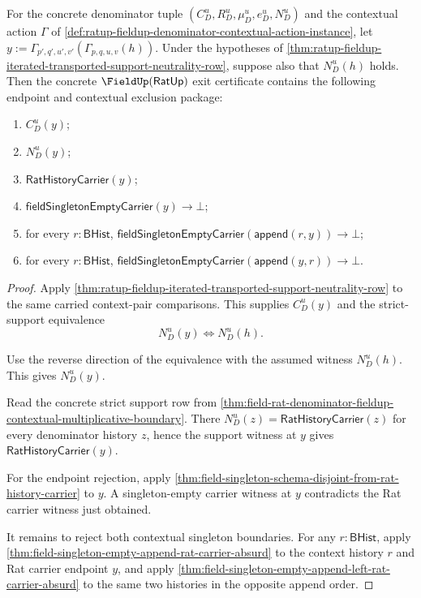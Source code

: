 \begin{theorem}
\label{thm:ratup-fieldup-iterated-transported-strict-support-contextual-singleton-exclusion}
For the concrete denominator tuple $(C_D^u,R_D^u,\mu_D^u,e_D^u,N_D^u)$ and the
contextual action $\Gamma$ of
\autoref{def:ratup-fieldup-denominator-contextual-action-instance}, let
$y:=\Gamma_{p',q',u',v'}(\Gamma_{p,q,u,v}(h))$. Under the hypotheses of
\autoref{thm:ratup-fieldup-iterated-transported-support-neutrality-row},
suppose also that $N_D^u(h)$ holds. Then the concrete
$\FieldUp(\mathsf{RatUp})$ exit certificate contains the following endpoint
and contextual exclusion package:
\begin{enumerate}
  \item $C_D^u(y)$;
  \item $N_D^u(y)$;
  \item $\mathsf{RatHistoryCarrier}(y)$;
  \item $\mathsf{fieldSingletonEmptyCarrier}(y)\to\bot$;
  \item for every $r:\mathsf{BHist}$,
  $\mathsf{fieldSingletonEmptyCarrier}(\mathsf{append}(r,y))\to\bot$;
  \item for every $r:\mathsf{BHist}$,
  $\mathsf{fieldSingletonEmptyCarrier}(\mathsf{append}(y,r))\to\bot$.
\end{enumerate}
\end{theorem}
\begin{proof}
Apply
\autoref{thm:ratup-fieldup-iterated-transported-support-neutrality-row} to the
same carried context-pair comparisons. This supplies $C_D^u(y)$ and the
strict-support equivalence
$$
N_D^u(y)\Longleftrightarrow N_D^u(h).
$$

Use the reverse direction of the equivalence with the assumed witness
$N_D^u(h)$. This gives $N_D^u(y)$.

Read the concrete strict support row from
\autoref{thm:field-rat-denominator-fieldup-contextual-multiplicative-boundary}.
There $N_D^u(z)=\mathsf{RatHistoryCarrier}(z)$ for every denominator history
$z$, hence the support witness at $y$ gives $\mathsf{RatHistoryCarrier}(y)$.

For the endpoint rejection, apply
\autoref{thm:field-singleton-schema-disjoint-from-rat-history-carrier} to
$y$. A singleton-empty carrier witness at $y$ contradicts the Rat carrier
witness just obtained.

It remains to reject both contextual singleton boundaries. For any
$r:\mathsf{BHist}$, apply
\autoref{thm:field-singleton-empty-append-rat-carrier-absurd} to the context
history $r$ and Rat carrier endpoint $y$, and apply
\autoref{thm:field-singleton-empty-append-left-rat-carrier-absurd} to the same
two histories in the opposite append order.
\end{proof}


